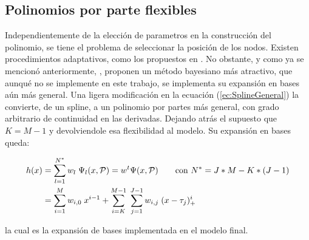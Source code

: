 \documentclass[../Main/Main.tex]{subfiles}
\begin{document}
\subsection{Polinomios por parte flexibles}
Independientemente de la elección de parametros en la construcción del polinomio, se tiene el problema de seleccionar la posición de los nodos. Existen procedimientos adaptativos, como los propuestos en \autocite{friedman1991multivariate}. No obstante, y como ya se mencionó anteriormente, \autocite{mallik1998automatic}, proponen un método bayesiano más atractivo, que aunqué no se implemente en este trabajo, se implementa su expansión en bases aún más general. Una ligera modificación en la ecuación (\ref{ec:SplineGeneral}) la convierte, de un spline, a un polinomio por partes más general, con grado arbitrario de continuidad en las derivadas. Dejando atrás el supuesto que $K = M-1$ y devolviendole esa flexibilidad al modelo. Su expansión en bases queda:

\begin{align}
	h(x) &= \sum_{l = 1}^{N^*} w_l \; \Psi_l(x,\mathcal{P}) = w^t\Psi(x,\mathcal{P}) \qquad \text{con  } N^* = J*M - K*(J-1) 
\label{ec:ExpBase_NEstrella} \\ 
 		 &=	\sum_{i = 1}^M w_{i,0} \; x^{i-1} + 
			\sum_{i = K}^{M-1} \;
	 		\sum_{j = 1}^{J-1}w_{i,j}\;(x - \tau_j)_+^{i}
	 			\label{ec:PoliMallik}
\end{align}

la cual es la expansión de bases implementada en el modelo final.\\
\end{document}

